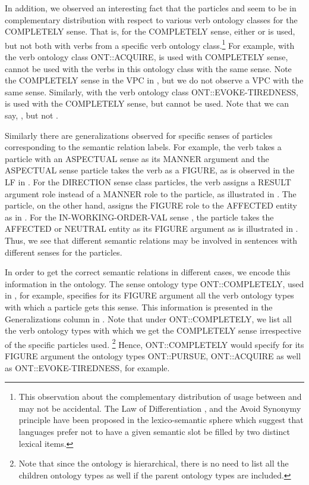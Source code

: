 \documentclass[output=paper
,modfonts
,nonflat]{langsci/langscibook}
\begin{document}
In addition, we observed an interesting fact that the particles  and  seem to be in complementary distribution with respect to various verb ontology classes for the COMPLETELY sense. That is, for the COMPLETELY sense, either  or  is used, but not both with verbs from a specific verb ontology class.\footnote{This observation about the complementary distribution of usage between  and  may not be accidental. The Law of Differentiation \citep{Pau90,Bre00}, and the Avoid Synonymy principle \citep{Kip83,Cla87} have been proposed in the lexico-semantic sphere which suggest that languages prefer not to have a given semantic slot be filled by two distinct lexical items.} For example, with the verb ontology class ONT::ACQUIRE,  is used with COMPLETELY sense,  cannot be used with the verbs in this ontology class with the same sense. Note the COMPLETELY sense in the VPC  in , but we do not observe a VPC  with the same sense. Similarly, with the verb ontology class ONT::EVOKE-TIREDNESS,  is used with the COMPLETELY sense, but  cannot be used. Note that we can say, , but not .

Similarly there are generalizations observed for specific senses of particles corresponding to the semantic relation labels. For example, the verb takes a particle with an ASPECTUAL sense as its MANNER argument and the ASPECTUAL sense particle takes the verb as a FIGURE, as is observed in the LF in . For the DIRECTION sense class particles, the verb assigns a RESULT argument role instead of a MANNER role to the particle, as illustrated in . The particle, on the other hand, assigns the FIGURE role to the AFFECTED entity as in . For the IN-WORKING-ORDER-VAL sense%
, the particle takes the AFFECTED or NEUTRAL entity as its FIGURE argument as is illustrated in . Thus, we see that different semantic relations may be involved in sentences with different senses for the particles.

In order to get the correct semantic relations in different cases, we encode this information in the ontology. The sense ontology type ONT::COMPLETELY, used in , for example, specifies for its FIGURE argument all the verb ontology types with which a particle gets this sense. This information is presented in %
the Generalizations column in . Note that %
under ONT::COMPLETELY, we list all the verb ontology types with which we get the COMPLETELY sense irrespective of the specific particles used.%
\footnote{Note that since the ontology is hierarchical, there is no need to list all the children ontology types as well if the parent ontology types are included.} Hence, ONT::COMPLETELY would specify for its FIGURE argument the ontology types ONT::PURSUE, ONT::ACQUIRE as well as ONT::EVOKE-TIREDNESS, for example. 
\end{document}
